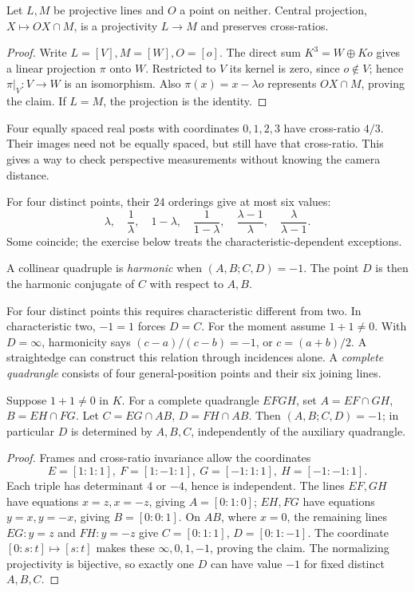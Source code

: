 \begin{proposition}\label{geometry:prop:perspectivity}
Let $L,M$ be projective lines and $O$ a point on neither. Central projection, $X\mapsto OX\cap M$, is a projectivity $L\to M$ and preserves cross-ratios.
\end{proposition}
\begin{proof}
Write $L=[V],M=[W],O=[o]$. The direct sum $K^3=W\oplus Ko$ gives a linear projection $\pi$ onto $W$. Restricted to $V$ its kernel is zero, since $o\notin V$; hence $\pi|_V:V\to W$ is an isomorphism. Also $\pi(x)=x-\lambda o$ represents $OX\cap M$, proving the claim. If $L=M$, the projection is the identity.
\end{proof}

Four equally spaced real posts with coordinates $0,1,2,3$ have cross-ratio $4/3$. Their images need not be equally spaced, but still have that cross-ratio. This gives a way to check perspective measurements without knowing the camera distance.

For four distinct points, their $24$ orderings give at most six values:
\[
\lambda,\quad\frac1\lambda,\quad1-\lambda,\quad
\frac1{1-\lambda},\quad\frac{\lambda-1}{\lambda},\quad
\frac\lambda{\lambda-1}.
\]
Some coincide; the exercise below treats the characteristic-dependent exceptions.

\begin{definition}
A collinear quadruple is \emph{harmonic} when $(A,B;C,D)=-1$. The point $D$ is then the harmonic conjugate of $C$ with respect to $A,B$.
\end{definition}

For four distinct points this requires characteristic different from two. In characteristic two, $-1=1$ forces $D=C$. For the moment assume $1+1\ne0$. With $D=\infty$, harmonicity says $(c-a)/(c-b)=-1$, or $c=(a+b)/2$. A straightedge can construct this relation through incidences alone. A \emph{complete quadrangle} consists of four general-position points and their six joining lines.

\begin{theorem}\label{geometry:thm:harmonic}
Suppose $1+1\ne0$ in $K$. For a complete quadrangle $EFGH$, set $A=EF\cap GH$, $B=EH\cap FG$. Let $C=EG\cap AB$, $D=FH\cap AB$. Then $(A,B;C,D)=-1$; in particular $D$ is determined by $A,B,C$, independently of the auxiliary quadrangle.
\end{theorem}
\begin{proof}
Frames and cross-ratio invariance allow the coordinates
\[
E=[1:1:1],\ F=[1:-1:1],\ G=[-1:1:1],\ H=[-1:-1:1].
\]
Each triple has determinant $4$ or $-4$, hence is independent. The lines $EF,GH$ have equations $x=z,x=-z$, giving $A=[0:1:0]$; $EH,FG$ have equations $y=x,y=-x$, giving $B=[0:0:1]$. On $AB$, where $x=0$, the remaining lines $EG:y=z$ and $FH:y=-z$ give $C=[0:1:1]$, $D=[0:1:-1]$. The coordinate $[0:s:t]\mapsto[s:t]$ makes these $\infty,0,1,-1$, proving the claim. The normalizing projectivity is bijective, so exactly one $D$ can have value $-1$ for fixed distinct $A,B,C$.
\end{proof}

